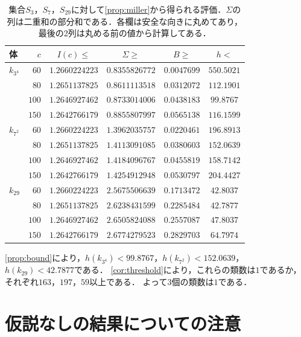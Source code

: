 \documentclass[11pt,a4paper]{ltjsarticle}
\makeatletter
\theoremstyle{ja}
\renewenvironment{proof}[1][証明]{\par
  \pushQED{\qed}\normalfont \topsep6\p@\@plus6\p@\relax
  \trivlist
  \item[\hskip\labelsep\bfseries #1]\hspace{1\zw}\ignorespaces
}{\popQED\endtrivlist\@endpefalse}
\makeatother
\begin{document}
\begin{table}[h]
\centering
\begin{tabular}{lrcccc}
\toprule
体 & $c$ & $I(c) \le$ & $\Sigma \ge$ & $B \ge$ & $h <$ \\
\midrule
$k_{3^4}$ & $60$ & $1.2660224223$ & $0.8355826772$ & $0.0047699$ & $550.5021$ \\
 & $80$ & $1.2651137825$ & $0.8611113518$ & $0.0312072$ & $112.1901$ \\
 & $100$ & $1.2646927462$ & $0.8733014006$ & $0.0438183$ & $99.8767$ \\
 & $150$ & $1.2642766179$ & $0.8855807997$ & $0.0565138$ & $116.1599$ \\
\midrule
$k_{7^2}$ & $60$ & $1.2660224223$ & $1.3962035757$ & $0.0220461$ & $196.8913$ \\
 & $80$ & $1.2651137825$ & $1.4113091085$ & $0.0380603$ & $152.0639$ \\
 & $100$ & $1.2646927462$ & $1.4184096767$ & $0.0455819$ & $158.7142$ \\
 & $150$ & $1.2642766179$ & $1.4254912948$ & $0.0530797$ & $204.4427$ \\
\midrule
$k_{29}$ & $60$ & $1.2660224223$ & $2.5675506639$ & $0.1713472$ & $42.8037$ \\
 & $80$ & $1.2651137825$ & $2.6238431599$ & $0.2285484$ & $42.7877$ \\
 & $100$ & $1.2646927462$ & $2.6505824088$ & $0.2557087$ & $47.8037$ \\
 & $150$ & $1.2642766179$ & $2.6774279523$ & $0.2829703$ & $64.7974$ \\
\bottomrule
\end{tabular}
\caption{集合$S_3$，$S_7$，$S_{29}$に対して\cref{prop:miller}から得られる評価．$\Sigma$の列は二重和の部分和である．各欄は安全な向きに丸めてあり，最後の2列は丸める前の値から計算してある．}
\label{tab:bounds}
\end{table}

\begin{proof}[\cref{thm:main}の証明]
\cref{prop:bound}により，$h(k_{3^4}) < 99.8767$，$h(k_{7^2}) < 152.0639$，$h(k_{29}) < 42.7877$である．
\cref{cor:threshold}により，これらの類数は$1$であるか，それぞれ$163$，$197$，$59$以上である．
よって3個の類数は$1$である．
\end{proof}

\section{仮説なしの結果についての注意} \label{sec:remarks}
\end{document}
